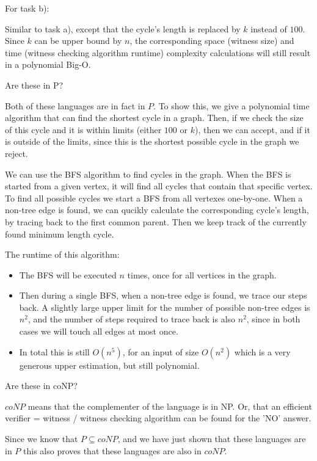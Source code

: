 For task b):

Similar to task a), except that the cycle's length is replaced by $k$ instead of $100$. Since $k$ can be upper bound by $n$, the corresponding space (witness size) and time (witness checking algorithm runtime) complexity calculations will still result in a polynomial Big-O.

Are these in P?

Both of these languages are in fact in $P$. To show this, we give a polynomial time algorithm that can find the shortest cycle in a graph. Then, if we check the size of this cycle and it is within limits (either $100$ or $k$), then we can accept, and if it is outside of the limits, since this is the shortest possible cycle in the graph we reject.

We can use the BFS algorithm to find cycles in the graph. When the BFS is started from a given vertex, it will find all cycles that contain that specific vertex. To find all possible cycles we start a BFS from all vertexes one-by-one. When a non-tree edge is found, we can qucikly calculate the corresponding cycle's length, by tracing back to the first common parent. Then we keep track of the currently found minimum length cycle.

The runtime of this algorithm:
\begin{itemize}
    \item The BFS will be executed $n$ times, once for all vertices in the graph.
    \item Then during a single BFS, when a non-tree edge is found, we trace our steps back. A slightly large upper limit for the number of possible non-tree edges is $n^2$, and the number of steps required to trace back is also $n^2$, since in both cases we will touch all edges at most once.
    \item In total this is still $O(n^5)$, for an input of size $O(n^2)$ which is a very generous upper estimation, but still polynomial.
\end{itemize}

Are these in coNP?

$coNP$ means that the complementer of the language is in NP. Or, that an efficient verifier = witness / witness checking algorithm can be found for the 'NO' answer.

Since we know that $P \subseteq{} coNP$, and we have just shown that these languages are in $P$ this also proves that these languages are also in $coNP$.